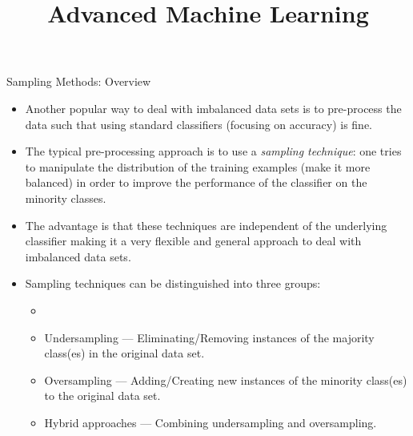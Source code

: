 \documentclass[11pt,compress,t,notes=noshow, xcolor=table]{beamer}
\title{Advanced Machine Learning}
\date{}
\begin{document}
	
	
	
	
	\sloppy
	
	
	
	\begin{frame}{Sampling Methods: Overview}
		\footnotesize
		\begin{itemize}
			\item Another popular way to deal with imbalanced data sets is to pre-process the data such that using standard classifiers (focusing on accuracy) is fine.
%			
			\item The typical pre-processing approach is to use a \emph{sampling technique}: one tries to manipulate the distribution of the training examples (make it more balanced) in order to improve the performance of the classifier on the minority classes.
			\item The advantage is that these techniques are independent of the underlying classifier making it a very flexible and general approach to deal with imbalanced data sets.
			\item Sampling techniques can be distinguished into three groups: \lz
			\begin{minipage}{0.5\textwidth}
%	
				\begin{itemize} \footnotesize
					\item[]
%					
					\item Undersampling --- Eliminating/Removing instances of the majority class(es) in the original data set.
					\item Oversampling --- Adding/Creating new instances of the minority class(es) to the original data set.
					\item Hybrid approaches --- Combining undersampling and oversampling.
				\end{itemize}
			\end{minipage}
			\begin{minipage}{0.4\textwidth}
					\begin{figure}
					\centering

\end{figure}
\end{minipage}
\end{itemize}
\end{frame}
\end{document}
